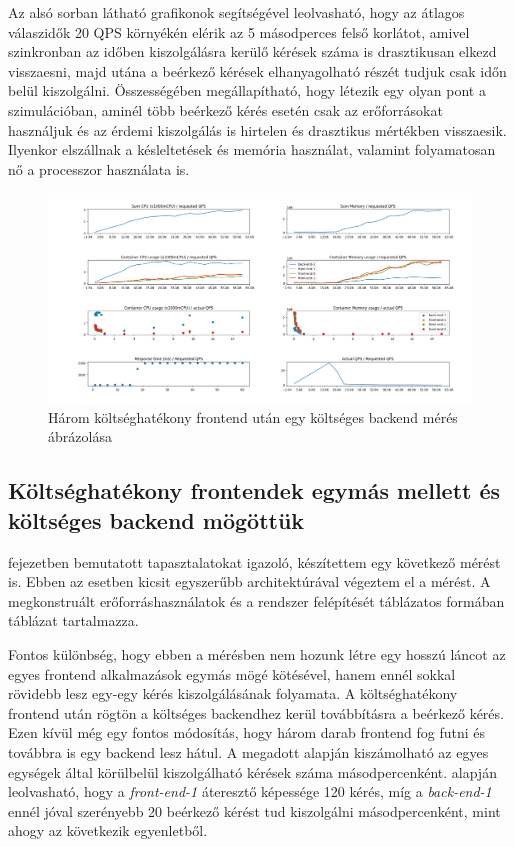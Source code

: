 Az alsó sorban látható grafikonok segítségével leolvasható, hogy az átlagos válaszidők 20 QPS környékén elérik az 5 másodperces felső korlátot, amivel szinkronban az időben kiszolgálásra kerülő kérések száma is drasztikusan elkezd visszaesni, majd utána a beérkező kérések elhanyagolható részét tudjuk csak időn belül kiszolgálni. 
Összességében megállapítható, hogy létezik egy olyan pont a szimulációban, aminél több beérkező kérés esetén csak az erőforrásokat használjuk és az érdemi kiszolgálás is hirtelen és drasztikus mértékben visszaesik.
Ilyenkor elszállnak a késleltetések és memória használat, valamint folyamatosan nő a processzor használata is.

\begin{figure}[!ht]
	\centering
	\includegraphics[width=150mm, keepaspectratio]{figures/taildrop-chain-3FE-1BE_requestedQPS.png}
	\caption{Három költséghatékony frontend után egy költséges backend mérés ábrázolása}
	\label{fig:3FE_1BE_chain}
\end{figure}

\subsection{Költséghatékony frontendek egymás mellett és költséges backend mögöttük}
 fejezetben bemutatott tapasztalatokat igazoló, készítettem egy következő mérést is. Ebben az esetben kicsit egyszerűbb architektúrával végeztem el a mérést. A megkonstruált erőforráshasználatok és a rendszer felépítését táblázatos formában  táblázat tartalmazza.

Fontos különbség, hogy ebben a mérésben nem hozunk létre egy hosszú láncot az egyes frontend alkalmazások egymás mögé kötésével, hanem ennél sokkal rövidebb lesz egy-egy kérés kiszolgálásának folyamata. 
A költséghatékony frontend után rögtön a költséges backendhez kerül továbbításra a beérkező kérés.
Ezen kívül még egy fontos módosítás, hogy három darab frontend fog futni és továbbra is egy backend lesz hátul.
A megadott alapján kiszámolható az egyes egységek által körülbelül kiszolgálható kérések száma másodpercenként.
 alapján leolvasható, hogy a \textit{front-end-1} áteresztő képessége 120 kérés, míg a \textit{back-end-1} ennél jóval szerényebb 20 beérkező kérést tud kiszolgálni másodpercenként, mint ahogy az következik  egyenletből.

